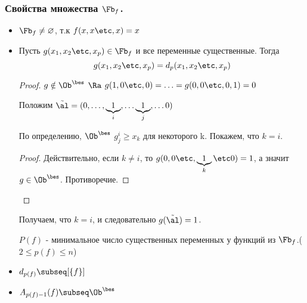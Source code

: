 \documentclass[unicode,10pt]{article}
\begin{document}
\subsubsection{Свойства множества $\Ff$.}
\begin{itemize}
  \item $\Ff\ne\varnothing$, т.к $f(x,x\etc,x) = x$ \THEN
  \item
    \begin{lemma}
      Пусть $g(x_1,x_2\etc,x_p) \in \Ff$ и все переменные существенные.
      Тогда
      \begin{displaymath}
        g(\set[x]{p}) = d_p(\set[x]{p})
      \end{displaymath}
    \end{lemma}
    \begin{proof}
      $g \notin \Oib$ $\Ra$ $g(1,0\etc,0)= \ldots =g(0,0\etc,0,1)=0$
      \WHY
      \par  Положим $\tilde \al = (0,\ldots,\underbrace{1}_i,\ldots\underbrace{1}_j,\ldots0)$
      \begin{stm}
        По определению, $\Oib$ $g^i_j\ge x_k$ для некоторого k. Покажем, что   $k=i$.
      \end{stm}
      \begin{proof}
        Действительно, если $k\neq i$, то $g(0,0\etc,\underbrace{1}_k\etc0) = 1$, а значит $g\in\Oib$. Противоречие.
      \end{proof}
      \THEN
    \end{proof}
    \begin{imp}
      Получаем, что $k=i$, и следовательно \WHY $g(\tilde \al)=1$.
    \end{imp}
    \begin{df}
      $P(f)$ - минимальное число существенных переменных у функций из $\Ff$.($2\le p(f)\le n$)
    \end{df}
  \item $d_{p(f)}\subseq\cls{f}$
  \item $A_{p(f)-1}(f)\subseq\Oib$
\end{itemize}
\end{document}
